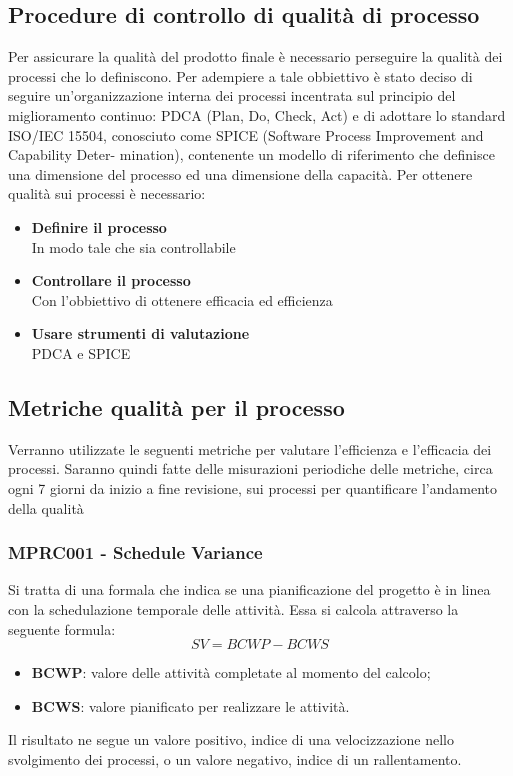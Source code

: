 {\subsection{Procedure di controllo di qualità di processo}
\label{sec:controllo_qualita}
Per assicurare la qualità del prodotto finale è necessario perseguire la qualità dei processi che lo definiscono. Per adempiere a tale obbiettivo è stato deciso di seguire un'organizzazione interna dei processi incentrata sul principio del miglioramento continuo: PDCA (Plan, Do, Check, Act) e di adottare lo standard ISO/IEC 15504, conosciuto come SPICE (Software Process Improvement and Capability Deter- mination), contenente un modello di riferimento che definisce una dimensione del processo ed una dimensione della capacità.
Per ottenere qualità sui processi è necessario:
\begin{itemize}
    \item \textbf{Definire il processo}\\ In modo tale che sia controllabile
    \item \textbf{Controllare il processo}\\ Con l'obbiettivo di ottenere efficacia ed efficienza  
    \item \textbf{Usare strumenti di valutazione}\\ PDCA e SPICE
\end{itemize}
\subsection{Metriche qualità per il processo}
\label{sec:qualita_processo}
Verranno utilizzate le seguenti metriche per valutare l’efficienza e l’efficacia dei processi. Saranno quindi fatte delle misurazioni periodiche delle metriche, circa ogni 7 giorni da inizio a fine revisione, sui processi per quantificare l'andamento della qualità
\subsubsection{MPRC001 - Schedule Variance}
Si tratta di una formala che indica se una pianificazione del progetto è in linea con la schedulazione temporale delle attività. Essa si calcola attraverso la seguente formula:
\begin{displaymath}
    SV = BCWP - BCWS
\end{displaymath}
\begin{itemize}
    \item \textbf{BCWP}: valore delle attività completate al momento del calcolo;
    \item \textbf{BCWS}: valore pianificato per realizzare le attività.
\end{itemize}
Il risultato ne segue un valore positivo, indice di una velocizzazione nello svolgimento dei processi, o un valore negativo, indice di un rallentamento.
}
